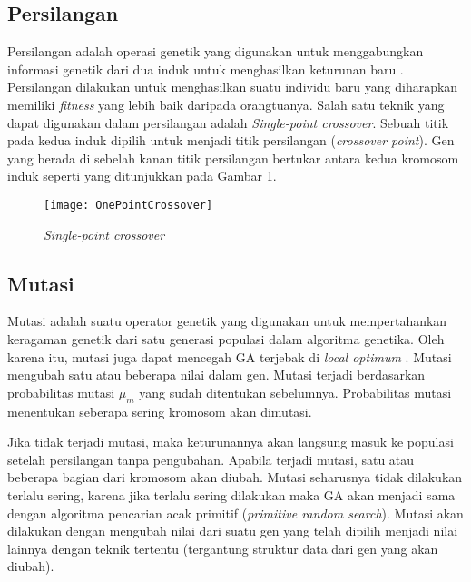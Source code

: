 \subsection{Persilangan}
\label{sub:crossover}
Persilangan adalah operasi genetik yang digunakan untuk menggabungkan informasi genetik dari dua induk untuk menghasilkan keturunan baru \cite{sivanandam2007introduction}. Persilangan dilakukan untuk menghasilkan suatu individu baru yang diharapkan memiliki \textit{fitness} yang lebih baik daripada orangtuanya. Salah satu teknik yang dapat digunakan dalam persilangan adalah \textit{Single-point crossover}. Sebuah titik pada kedua induk dipilih untuk menjadi titik persilangan (\textit{crossover point}). Gen yang berada di sebelah kanan titik persilangan bertukar antara kedua kromosom induk seperti yang ditunjukkan pada Gambar \ref{fig:spcrossover}.

\begin{figure}[h]
	\begin{center}
		\texttt{[image: OnePointCrossover]}
		\caption{\textit{Single-point crossover}}
		\label{fig:spcrossover}
	\end{center}
\end{figure}

\subsection{Mutasi}
\label{sub:mutation}
Mutasi adalah suatu operator genetik yang digunakan untuk mempertahankan keragaman genetik dari satu generasi populasi dalam algoritma genetika. Oleh karena itu, mutasi juga dapat mencegah GA terjebak di \textit{local optimum} \cite{sivanandam2007introduction}. Mutasi mengubah satu atau beberapa nilai dalam gen. Mutasi terjadi berdasarkan probabilitas mutasi $\mu_m$ yang sudah ditentukan sebelumnya. Probabilitas mutasi menentukan seberapa sering kromosom akan dimutasi. 

Jika tidak terjadi mutasi, maka keturunannya akan langsung masuk ke populasi setelah persilangan tanpa pengubahan. Apabila terjadi mutasi, satu atau beberapa bagian dari kromosom akan diubah. Mutasi seharusnya tidak dilakukan terlalu sering, karena jika terlalu sering dilakukan maka GA akan menjadi sama dengan algoritma pencarian acak primitif (\textit{primitive random search}). Mutasi akan dilakukan dengan mengubah nilai dari suatu gen yang telah dipilih menjadi nilai lainnya dengan teknik tertentu (tergantung struktur data dari gen yang akan diubah).

